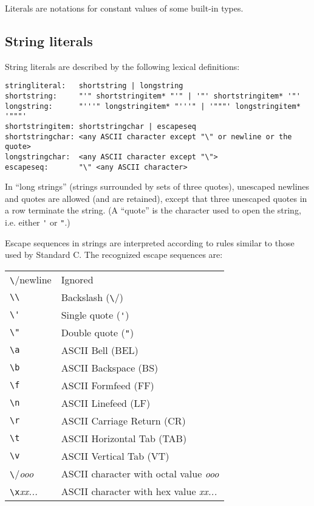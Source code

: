 Literals are notations for constant values of some built-in types.

\subsection{String literals}

String literals are described by the following lexical definitions:

\begin{verbatim}
stringliteral:   shortstring | longstring
shortstring:     "'" shortstringitem* "'" | '"' shortstringitem* '"'
longstring:      "'''" longstringitem* "'''" | '"""' longstringitem* '"""'
shortstringitem: shortstringchar | escapeseq
shortstringchar: <any ASCII character except "\" or newline or the quote>
longstringchar:  <any ASCII character except "\">
escapeseq:       "\" <any ASCII character>
\end{verbatim}

In ``long strings'' (strings surrounded by sets of three quotes),
unescaped newlines and quotes are allowed (and are retained), except
that three unescaped quotes in a row terminate the string.  (A
``quote'' is the character used to open the string, i.e. either
\verb/'/ or \verb/"/.)

Escape sequences in strings are interpreted according to rules similar
to those used by Standard C.  The recognized escape sequences are:

\begin{center}
\begin{tabular}{|l|l|}
\hline
\verb/\/{newline}	& Ignored \\
\verb/\\/	& Backslash (\verb/\/) \\
\verb/\'/	& Single quote (\verb/'/) \\
\verb/\"/	& Double quote (\verb/"/) \\
\verb/\a/	& ASCII Bell (BEL) \\
\verb/\b/	& ASCII Backspace (BS) \\
\verb/\f/	& ASCII Formfeed (FF) \\
\verb/\n/	& ASCII Linefeed (LF) \\
\verb/\r/	& ASCII Carriage Return (CR) \\
\verb/\t/	& ASCII Horizontal Tab (TAB) \\
\verb/\v/	& ASCII Vertical Tab (VT) \\
\verb/\/{\em ooo}	& ASCII character with octal value {\em ooo} \\
\verb/\x/{\em xx...}	& ASCII character with hex value {\em xx...} \\
\hline
\end{tabular}
\end{center}

